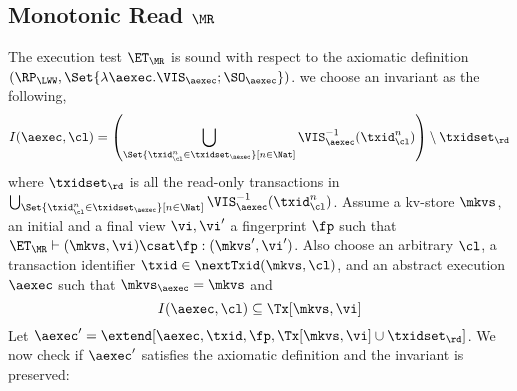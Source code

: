 \subsection{Monotonic Read \( \MR \)}
\label{sec:sound-complete-mr}

The execution test $\ET_\MR$ is sound with respect to the axiomatic definition $(\RP_{\LWW}, \Set{\lambda \aexec. \VIS_{\aexec} ; \SO_{\aexec} })$. 
we choose an invariant as the following,  
\[
    I(\aexec, \cl) = \left( \bigcup_{\Set{\txid_{\cl}^{n} \in \txidset_{\aexec} }[ n \in \Nat]} \VIS_{\aexec}^{-1}(\txid^n_\cl) \right) \setminus \txidset_\rd
\]
where \( \txidset_\rd \) is all the read-only transactions in 
\( \bigcup_{\Set{\txid_{\cl}^{n} \in \txidset_{\aexec} }[ n \in \Nat]} \VIS_{\aexec}^{-1}(\txid^n_\cl) \).
Assume a kv-store $\mkvs$, an initial and a final view $\vi, \vi'$  a fingerprint $\fp$ 
such that $\ET_{\MR} \vdash (\mkvs, \vi) \csat \fp: (\mkvs',\vi')$. 
Also choose an arbitrary $\cl$, a transaction identifier $\txid \in \nextTxid(\mkvs, \cl)$, 
and an abstract execution $\aexec$ such that $\mkvs_{\aexec} = \mkvs$ and 
\begin{equation}
I(\aexec, \cl) \subseteq \Tx[\mkvs, \vi]
\label{eq:mr_invariant}
\end{equation}
Let \( \aexec' = \extend[\aexec, \txid, \fp, \Tx[\mkvs, \vi] \cup \txidset_\rd] \).
We now check if \( \aexec' \) satisfies the axiomatic definition and the invariant is preserved:
